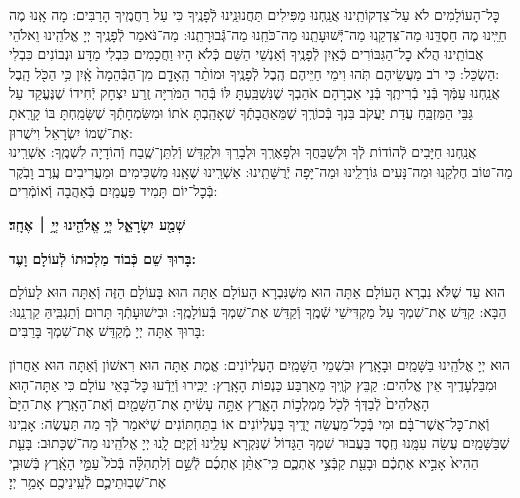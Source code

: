 \documentclass[twoside, openany, parskip=half, 11pt]{book}
\begin{document}
כׇּל־הָעוֹלָמִים לֹא עַל־צִדְקוֹתֵֽינוּ אֲנַֽחְנוּ מַפִּילִים תַּחֲנוּנֵֽינוּ לְֿפָנֶֽיךָ כִּי עַל רַחֲמֶֽיךָ הָרַבִּים: מָה אָֽנוּ מֶה חַיֵּֽינוּ מֶה חַסְדֵּֽנוּ מַה־צִּדְקֵֽנוּ מַה־יְּֿשׁוּעָתֵֽנוּ מַה־כֹּחֵֽנוּ מַה־גְּֿבוּרָתֵֽנוּ: מַה־נֹּאמַר לְֿפָנֶֽיךָ יְיָ אֱלֹהֵֽינוּ וֵאלֹהֵי אֲבוֹתֵֽינוּ הֲלֹא כׇל־הַגִּבּוֹרִים כְּֿאַֽיִן לְֿפָנֶֽיךָ וְֿאַנְשֵׁי הַשֵּׁם כְּֿלֹא הָיוּ וַחֲכָמִים כִּבְלִי מַדָּע וּנְבוֹנִים כִּבְלִי הַשְׂכֵּל: כִּי רֹב מַעֲשֵׂיהֶם תֹּֽהוּ וִימֵי חַיֵּיהֶם הֶֽבֶל לְֿפָנֶֽיךָ וּמוֹתַ֨ר הָֽאָדָ֤ם מִן־הַבְּֿהֵמָה֙ אָֽ֔יִן כִּ֥י הַכֹּ֖ל הָֽבֶל: \\
אֲנַֽחְנוּ עַמְּֿךָ בְּֿנֵי בְֿרִיתֶֽךָ בְּֿנֵי אַבְרָהָם אֹהַבְךָ שֶׁנִּשְׁבַּֽעְתָּ לּוֹ בְּֿהַר הַמֹּרִיָּה זֶֽרַע יִצְחָק יְֿחִידוֹ שֶׁנֶּעֱקַד עַל גַּבֵּי הַמִּזְבֵּֽחַ עֲדַת יַעֲקֹב בִּנְךָ בְּֿכוֹרֶֽךָ שֶׁמֵּאַהֲבָתְֿךָ שֶׁאָהַֽבְתָּ אֹתוֹ וּמִשִּׂמְחָתְֿךָ שֶׁשָּׂמַֽחְתָּ בּוֹ קָרָֽאתָ אֶת־שְׁמוֹ יִשְׂרָאֵל וִישֻׁרוּן: \\
אֲנַֽחְנוּ חַיָּבִים לְֿהוֹדוֹת לְֿךָ וּלְשַׁבֵּחֲךָ וּלְפָאֶרְֽךָ וּלְבָרֵךְ וּלְקַדֵּשׁ וְֿלִתֵּן־שֶֽׁבַח וְֿהוֹדָיָה לִשְׁמֶֽךָ: אַשְׁרֵֽינוּ מַה־טּוֹב חֶלְקֵֽנוּ וּמַה־נָּעִים גּוֹרָלֵֽינוּ וּמַה־יָּפָה יְֿרֻשָּׁתֵֽינוּ: אַשְׁרֵֽינוּ שֶׁאָֽנוּ מַשְׁכִּימִים וּמַעֲרִיבִים עֶֽרֶב וָבֹֽקֶר בְּֿכׇל־יוֹם תָּמִיד פַּעֲמַֽיִם בְּֿאַהֲבָה וְֿאוֹמְֿרִים:

\begin{Large}
\textbf{שְׁמַ֖ע יִשְׂרָאֵ֑ל יְיָ֥ אֱלֹהֵ֖ינוּ יְיָ֥ ׀ אֶחָֽד׃}
\end{Large}

\textbf{%
בָּרוּךְ שֵׁם כְּֿבוֹד מַלְכוּתוֹ לְֿעוֹלָם וָעֶד:
}


הוּא עַד שֶׁלֹּא נִבְרָא הָעוֹלָם אַתָּה הוּא מִשֶּׁנִּבְרָא הָעוֹלָם אַתָּה הוּא בָּעוֹלָם הַזֶּה וְֿאַתָּה הוּא לָעוֹלָם הַבָּא: קַדֵּשׁ אֶת־שִׁמְךָ עַל מַקְדִּישֵׁי שְֿׁמֶֽךָ וְֿקַדֵּשׁ אֶת־שִׁמְךָ בְּֿעוֹלָמֶֽךָ: וּבִישׁוּעָתְֿךָ תָּרוּם וְֿתַגְבִּֽיהַּ קַרְנֵֽנוּ: בָּרוּךְ אַתָּה יְיָ מְֿקַדֵּשׁ אֶת־שִׁמְךָ בָּרַבִּים:

הוּא יְיָ אֱלֹהֵֽינוּ בַּשָּׁמַֽיִם וּבָאָֽרֶץ וּבִשְׁמֵי הַשָּׁמַֽיִם הָעֶלְיוֹנִים: אֱמֶת אַתָּה הוּא רִאשׁוֹן וְֿאַתָּה הוּא אַחֲרוֹן וּמִבַּלְעָדֶֽיךָ אֵין אֱלֹהִים: קַבֵּץ קֹוֶֽיךָ מֵאַרְבַּע כַּנְפוֹת הָאָֽרֶץ: יַכִּֽירוּ וְֿיֵדְֿעוּ כׇּל־בָּאֵי עוֹלָם כִּי אַתָּה־ה֤וּא הָאֱלֹהִים֙ לְֿבַדְּךָ֔ לְֿכֹ֖ל מַמְלְכ֣וֹת הָאָ֑רֶץ אַתָּ֣ה עָשִׂ֔יתָ אֶת־הַשָּׁמַ֖יִם וְֿאֶת־הָאָֽרֶץ׃ אֶת־הַיָּם֙ וְֿאֶת־כׇּל־אֲשֶׁר־בָּ֔ם׃ וּמִי בְּֿכׇל־מַעֲשֵׂה יָדֶֽיךָ בָּעֶלְיוֹנִים אוֹ בַתַּחְתּוֹנִים שֶׁיֹּאמַר לְֿךָ מַה תַּעֲשֶׂה: אָבִֽינוּ שֶׁבַּשָּׁמַֽיִם עֲשֵׂה עִמָּֽנוּ חֶֽסֶד בַּעֲבוּר שִׁמְךָ הַגָּדוֹל שֶׁנִּקְרָא עָלֵֽינוּ וְֿקַיֶּם לָֽנוּ יְיָ אֱלֹהֵֽינוּ מַה־שֶׁכָּתוּב: בָּעֵ֤ת הַהִיא֙ אָבִ֣יא אֶתְכֶ֔ם וּבָעֵ֖ת קַבְּֿצִ֣י אֶתְכֶ֑ם כִּֽי־אֶתֵּ֨ן אֶתְכֶ֜ם לְֿשֵׁ֣ם וְֿלִתְהִלָּ֗ה בְּֿכֹל֙ עַמֵּ֣י הָאָֽ֔רֶץ בְּֿשׁוּבִ֧י אֶת־שְׁבֽוּתֵיכֶ֛ם לְֿעֵֽינֵיכֶ֖ם אָמַ֥ר יְיָ׃
\end{document}
